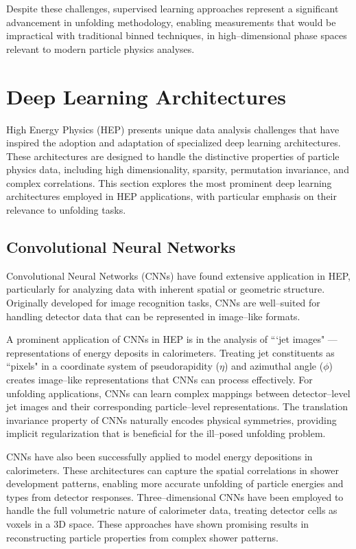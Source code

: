         Despite these challenges, supervised learning approaches represent a significant advancement in unfolding methodology, enabling measurements that would be impractical with traditional binned techniques,  in high--dimensional phase spaces relevant to modern particle physics analyses.



\section{Deep Learning Architectures}
High Energy Physics (HEP) presents unique data analysis challenges that have inspired the adoption and adaptation of specialized deep learning architectures.
%
These architectures are designed to handle the distinctive properties of particle physics data, including high dimensionality, sparsity, permutation invariance, and complex correlations.
%
This section explores the most prominent deep learning architectures employed in HEP applications, with particular emphasis on their relevance to unfolding tasks.
\subsection{Convolutional Neural Networks}
    Convolutional Neural Networks (CNNs) have found extensive application in HEP, particularly for analyzing data with inherent spatial or geometric structure.
    Originally developed for image recognition tasks, CNNs are well--suited for handling detector data that can be represented in image--like formats.
    
    A prominent application of CNNs in HEP is in the analysis of ```jet images" --- representations of energy deposits in calorimeters.
    Treating jet constituents as ``pixels" in a coordinate system of pseudorapidity (\(\eta\)) and azimuthal angle (\(\phi\)) creates image--like representations that CNNs can process effectively.
    For unfolding applications, CNNs can learn complex mappings between detector--level jet images and their corresponding particle--level representations.
    The translation invariance property of CNNs naturally encodes physical symmetries, providing implicit regularization that is beneficial for the ill--posed unfolding problem.\kd{}
    
    CNNs have also been successfully applied to model energy depositions in calorimeters.\kd{}
    These architectures can capture the spatial correlations in shower development patterns, enabling more accurate unfolding of particle energies and types from detector responses.
    Three--dimensional CNNs have been employed to handle the full volumetric nature of calorimeter data, treating detector cells as voxels in a 3D space.\kd{}
    These approaches have shown promising results in reconstructing particle properties from complex shower patterns.\kd{}
